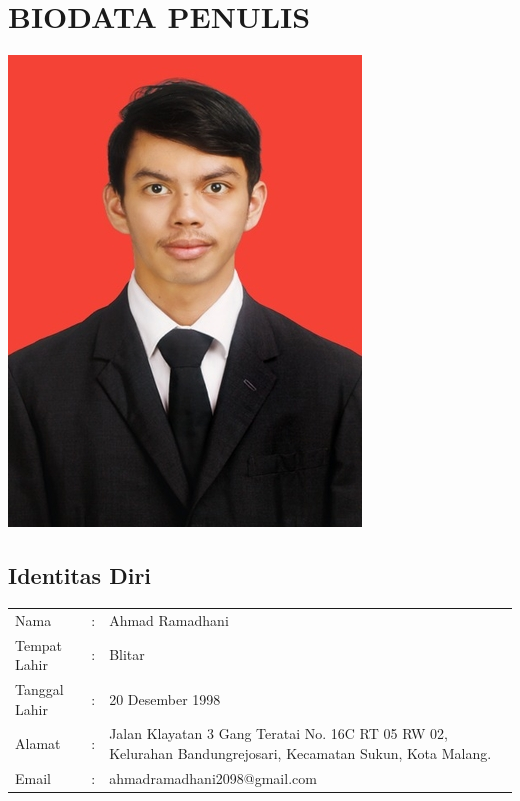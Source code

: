\chapter*{BIODATA PENULIS}
	\begin{center}
		\includegraphics[height=0.2\textheight]{./ubah/3-Pas_Foto_dhani.jpg}
	\end{center}
\section*{Identitas Diri}
\begin{tabular}{p{3cm}cp{9cm}}
	Nama  		  & :&
		Ahmad Ramadhani \\
	Tempat Lahir  & :&
		Blitar\\
	Tanggal Lahir &:& 
		20 Desember 1998\\
	Alamat        &:& 
	Jalan Klayatan 3 Gang Teratai No. 16C RT 05 RW 02, Kelurahan Bandungrejosari, Kecamatan Sukun, Kota Malang.\\
	Email   &:&
		 ahmadramadhani2098@gmail.com\\
\end{tabular}

